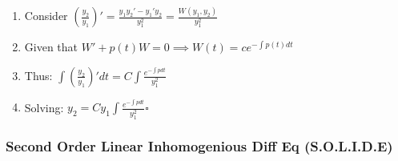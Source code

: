 \documentclass[11pt]{article}
\begin{document}
\begin{itemize}
\begin{enumerate}
\begin{enumerate}
\item Consider $(\frac{y_2}{y_1})' = \frac{y_1 y_2' - y_1'y_2}{y_1^2}=\frac{W(y_1,y_2)}{y_1^2}$
\item Given that $W'+p(t)W=0 \implies W(t)=ce^{-\int p(t) dt}$
\item Thus: $\int (\frac{y_2}{y_1})'dt = C \int \frac{e^{-\int p
           dt}}{y_1^2}$
\item Solving: $y_2=Cy_1\int \frac{e^{-\int p
           dt}}{y_1^2} \square$
\end{enumerate}

\end{enumerate}
\end{itemize} %
\subsubsection{Second Order Linear Inhomogenious Diff Eq (S.O.L.I.D.E)}
\label{sec-9.2.5}
\end{document}
